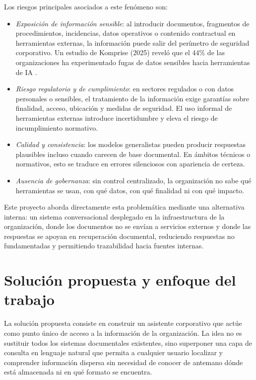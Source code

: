 Los riesgos principales asociados a este fenómeno son:

\begin{itemize}
    \item \textit{Exposición de información sensible}: al introducir documentos, fragmentos de procedimientos, incidencias, datos operativos o contenido contractual en herramientas externas, la información puede salir del perímetro de seguridad corporativo. Un estudio de Komprise (2025) reveló que el 44\% de las organizaciones ha experimentado fugas de datos sensibles hacia herramientas de IA \cite{komprise2025survey}.
    \item \textit{Riesgo regulatorio y de cumplimiento}: en sectores regulados o con datos personales o sensibles, el tratamiento de la información exige garantías sobre finalidad, acceso, ubicación y medidas de seguridad. El uso informal de herramientas externas introduce incertidumbre y eleva el riesgo de incumplimiento normativo.
    \item \textit{Calidad y consistencia}: los modelos generalistas pueden producir respuestas plausibles incluso cuando carecen de base documental. En ámbitos técnicos o normativos, esto se traduce en errores silenciosos con apariencia de certeza.
    \item \textit{Ausencia de gobernanza}: sin control centralizado, la organización no sabe qué herramientas se usan, con qué datos, con qué finalidad ni con qué impacto.
\end{itemize}

Este proyecto aborda directamente esta problemática mediante una alternativa interna: un sistema conversacional desplegado en la infraestructura de la organización, donde los documentos no se envían a servicios externos y donde las respuestas se apoyan en recuperación documental, reduciendo respuestas no fundamentadas y permitiendo trazabilidad hacia fuentes internas.

\section{Solución propuesta y enfoque del trabajo}
\label{sec:solucion}

La solución propuesta consiste en construir un asistente corporativo que actúe como punto único de acceso a la información de la organización. La idea no es sustituir todos los sistemas documentales existentes, sino superponer una capa de consulta en lenguaje natural que permita a cualquier usuario localizar y comprender información dispersa sin necesidad de conocer de antemano dónde está almacenada ni en qué formato se encuentra.

